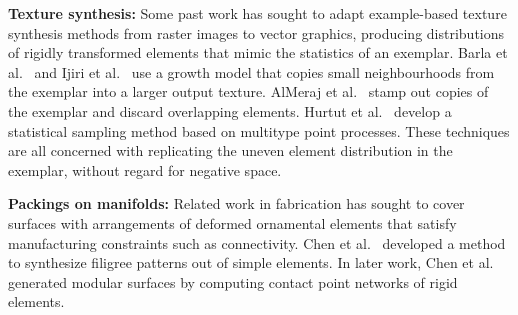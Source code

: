 \textbf{Texture synthesis:}
Some past work has sought to adapt example-based texture synthesis methods
from raster images to vector graphics, producing distributions of rigidly transformed elements
that mimic the statistics of an exemplar.  Barla et al.~\cite{Barla2006} and
Ijiri et al.~\cite{Ijiri2008} use a growth model that copies small neighbourhoods
from the exemplar into a larger output texture.  AlMeraj et al.~\cite{AlMeraj2013}
stamp out copies of the exemplar and discard overlapping elements.
Hurtut et al.~\cite{Hurtut2009} develop a statistical sampling method based
on multitype point processes.  
These techniques are all concerned with replicating
the uneven element distribution in the exemplar, without regard for negative space.



\textbf{Packings on manifolds:}
Related work in fabrication has sought to cover surfaces with
arrangements of deformed ornamental elements that satisfy manufacturing
constraints such as connectivity.  Chen et al.~\cite{Chen2016}
developed a method to synthesize filigree patterns out of simple
elements. 
In later work, Chen et al.~\cite{Chen2017}
generated modular surfaces by computing 
contact point networks of rigid elements.





